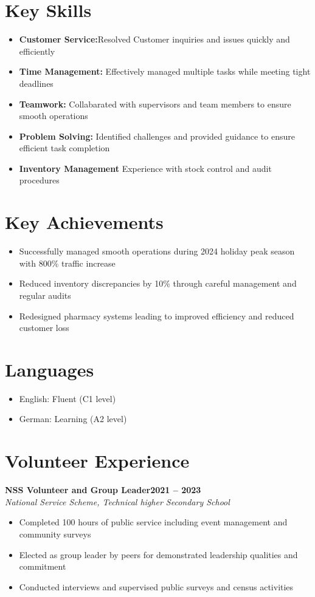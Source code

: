 \documentclass[11pt,a4paper]{article}
\begin{document}
\section{Key Skills}
\begin{itemize}
    \item \textbf {Customer Service:}Resolved Customer inquiries and issues quickly and efficiently
    \item\textbf{Time Management:} Effectively managed multiple tasks while meeting tight deadlines
    \item \textbf{Teamwork:} Collabarated with supervisors and team members to ensure smooth operations
    \item\textbf{Problem Solving:} Identified challenges and provided guidance to ensure efficient task completion
    \item \textbf{Inventory Management} Experience with stock control and audit procedures
\end{itemize}

\section{Key Achievements}   \begin{itemize}

 \item Successfully managed smooth operations during 2024 holiday peak season with 800\% traffic increase
 \item Reduced inventory discrepancies by 10\% through careful management and regular audits
 \item Redesigned pharmacy systems leading to improved efficiency and reduced customer loss
\end{itemize}

\section{Languages}
\begin{itemize}
    \item English: Fluent (C1 level)
    \item German: Learning (A2 level)
\end{itemize}

\section{Volunteer Experience}
\textbf{NSS Volunteer and Group Leader}\hfill \textbf{2021 -- 2023}\\
\textit{National Service Scheme, Technical higher Secondary School}
\begin{itemize}
    \item Completed 100 hours of public service including event management and community surveys
    \item Elected as group leader by peers for demonstrated leadership qualities and commitment
    \item Conducted interviews and supervised public surveys and census activities
\end{itemize}
\end{document}
